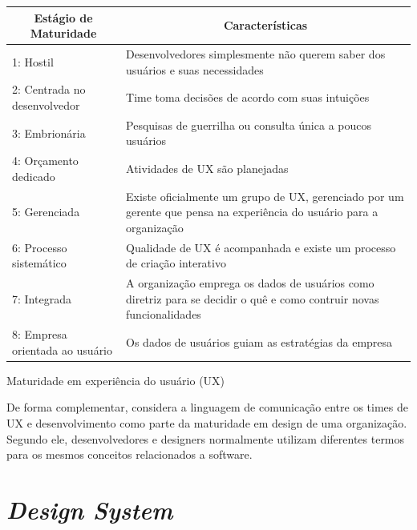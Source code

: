 \begin{quadro}[!htb]
\centering
\begin{tabular}{|m{5cm}|m{9cm}|} \hline
	
	\multicolumn{1}{|c|}{\bfseries Estágio de Maturidade} & \multicolumn{1}{c|}{\bfseries Características} \\\hline
	
	 1: Hostil & Desenvolvedores simplesmente não querem saber dos usuários e suas necessidades \\\hline
	 
	 2: Centrada no desenvolvedor & Time toma decisões de acordo com suas intuições \\\hline
	 
	 3: Embrionária & Pesquisas de guerrilha ou consulta única a poucos usuários \\\hline
	 
	 4: Orçamento dedicado & Atividades de UX são planejadas \\\hline
	 
	 5: Gerenciada & Existe oficialmente um grupo de UX, gerenciado por um gerente que pensa na experiência do usuário para a organização \\\hline
	 
	 6: Processo sistemático & Qualidade de UX é acompanhada e existe um processo de criação interativo \\\hline
	 
	 7: Integrada & A organização emprega os dados de usuários como diretriz para se decidir o quê e como contruir novas funcionalidades \\\hline
	 
	 8: Empresa orientada ao usuário & Os dados de usuários guiam as estratégias da empresa \\\hline
    
\end{tabular}
\caption{Maturidade em experiência do usuário (UX)}
\label{table:uxMaturity}
\end{quadro}

De forma complementar,  considera a linguagem de comunicação entre os times de UX e desenvolvimento como parte da maturidade em design de uma organização. Segundo ele, desenvolvedores e designers normalmente utilizam diferentes termos para os mesmos conceitos relacionados a software.

\section{\textit{Design System}}
\label{sec:designSystem}

